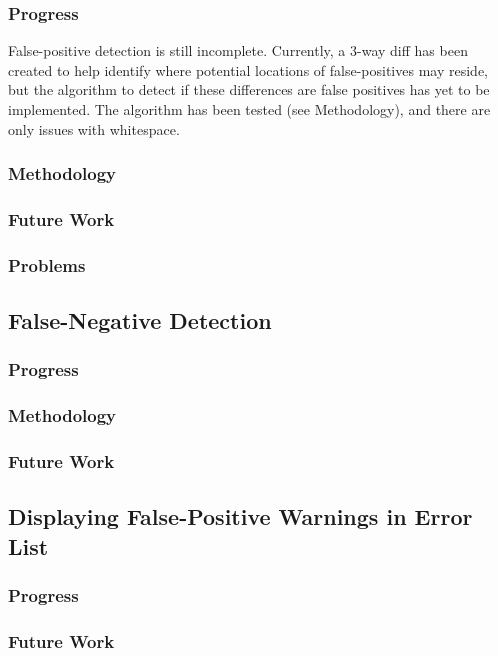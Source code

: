 \documentclass[10pt,draftclsnofoot,onecolumn]{IEEEtran}
\begin{document}
\subsubsection{Progress}
False-positive detection is still incomplete. Currently, a 3-way diff has been created to help identify where potential locations of false-positives may reside, but the algorithm to detect if these differences are false positives has yet to be implemented. The algorithm has been tested (see Methodology), and there are only issues with whitespace.

\subsubsection{Methodology}


\subsubsection{Future Work}


\subsubsection{Problems}


\subsection{False-Negative Detection}
\subsubsection{Progress}


\subsubsection{Methodology}


\subsubsection{Future Work}


\subsection{Displaying False-Positive Warnings in Error List}
\subsubsection{Progress}


\subsubsection{Future Work}
\end{document}
